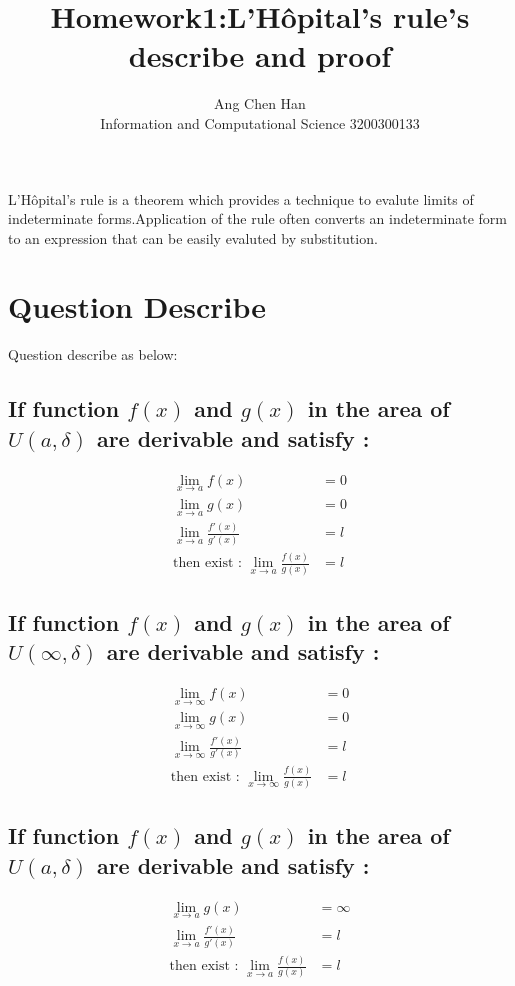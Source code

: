 \documentclass{ctexart}
\title{Homework1:L'H\^opital's rule's describe and proof}
\author{Ang Chen Han \\ Information and Computational Science 3200300133}
\begin{document}
\maketitle


L'H\^opital's rule is a theorem which provides a technique to evalute limits of indeterminate forms.Application of the rule often converts an indeterminate form to an expression that can be easily evaluted by substitution.

\section{Question Describe}
Question describe as below:
\subsection{If function $f(x)$ and $g(x)$ in the area of $U(a,\delta)$ are derivable and satisfy :}
\begin{align}
\lim_{x \rightarrow a}f(x)&=0\\
\lim_{x \rightarrow a}g(x)&=0\\
\lim_{x \rightarrow a}\frac{f'(x)}{g'(x)}&=l \\
\text{then exist : }\lim_{x \rightarrow a}\frac{f(x)}{g(x)}&=l
\end{align}

\subsection{If function $f(x)$ and $g(x)$ in the area of $U(\infty,\delta)$ are derivable and satisfy :}
\begin{align}
\lim_{x \rightarrow \infty}f(x)&=0\label{eq::first}\\
\lim_{x \rightarrow \infty}g(x)&=0\label{eq::second}\\
\lim_{x \rightarrow \infty}\frac{f'(x)}{g'(x)}&=l \\
\text{then exist : }\lim_{x \rightarrow \infty}\frac{f(x)}{g(x)}&=l
\end{align}

\subsection{If function $f(x)$ and $g(x)$ in the area of $U(a,\delta)$ are derivable and satisfy :}
\begin{align}
\lim_{x \rightarrow a}g(x)&=\infty\\
\lim_{x \rightarrow a}\frac{f'(x)}{g'(x)}&=l \\
\text{then exist : }\lim_{x \rightarrow a}\frac{f(x)}{g(x)}&=l
\end{align}
\end{document}
